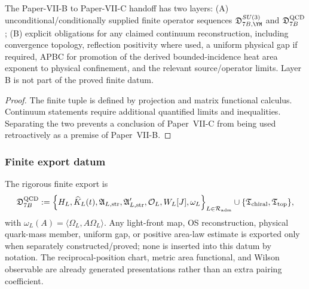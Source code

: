 \documentclass[12pt,a4paper]{article}
\begin{document}
\begin{theorem}
\label{p11:thm:two-layer-paper-xi-export-paper-xii}
\label{p11:thm:paper-xi-xii-handoff}

The Paper-VII-B to Paper-VII-C handoff has two layers: (A) unconditional/conditionally supplied finite operator sequences \(\mathfrak D_{7B,\YM}^{SU(3)}\) and \(\mathfrak D_{7B}^{\rm QCD}\); (B) explicit obligations for any claimed continuum reconstruction, including convergence topology, reflection positivity where used, a uniform physical gap if required, APBC for promotion of the derived bounded-incidence heat area exponent to physical confinement, and the relevant source/operator limits.  Layer B is not part of the proved finite datum.

\end{theorem}
\begin{proof}

The finite tuple is defined by projection and matrix functional calculus.  Continuum statements require additional quantified limits and inequalities.  Separating the two prevents a conclusion of Paper~VII-C from being used retroactively as a premise of Paper~VII-B.
\end{proof}


\subsubsection{Finite export datum}
\label{p11:subsec:finite-export-datum-paper-xii}

\begin{definition}
\label{p11:def:pure-g-wilson-continuum-datum}
The rigorous finite export is
\begin{equation}
\label{p11:eq:paper-xii-export-datum}
\mathfrak D_{7B}^{\rm QCD}
:=\left\{H_L,\widehat K_L(t),\mathfrak A_{L,{\rm str}},\mathfrak A'_{L,{\rm str}},\mathcal O_L,W_L[J],\omega_L\right\}_{L\in\mathcal R_{\rm adm}}
\cup\{\mathfrak T_{\rm chiral},\mathfrak T_{\rm top}\},
\end{equation}
with \(\omega_L(A)=\langle\Omega_L,A\Omega_L\rangle\).  Any light-front map, OS reconstruction, physical quark-mass member, uniform gap, or positive area-law estimate is exported only when separately constructed/proved; none is inserted into this datum by notation.  The reciprocal-position chart, metric area functional, and Wilson observable are already generated presentations rather than an extra pairing coefficient.
\end{definition}
\end{document}
